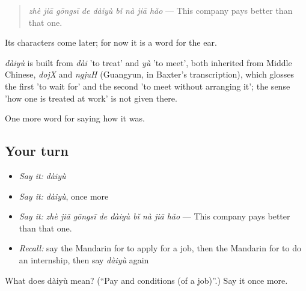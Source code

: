 \begin{quote}
\emph{zhè jiā gōngsī de dàiyù bǐ nà jiā hǎo} — This company pays better than that one.
\end{quote}

Its characters come later; for now it is a word for the ear.

\begin{cousinweb}
\emph{dàiyù} is built from \emph{dài} 'to treat' and \emph{yù} 'to meet', both inherited from Middle Chinese, \emph{dojX} and \emph{ngjuH} (Guangyun, in Baxter's transcription), which glosses the first 'to wait for' and the second 'to meet without arranging it'; the sense 'how one is treated at work' is not given there.
\end{cousinweb}

\begin{grammarlens}[title={What you've built}]
One more word for saying how it was.
\end{grammarlens}

\subsection*{Your turn}
\begin{itemize}
\raggedright
  \item \emph{Say it:} \emph{dàiyù}
  \item \emph{Say it:} \emph{dàiyù}, once more
  \item \emph{Say it:} \emph{zhè jiā gōngsī de dàiyù bǐ nà jiā hǎo} — This company pays better than that one.
  \item \emph{Recall:} say the Mandarin for to apply for a job, then the Mandarin for to do an internship, then say \emph{dàiyù} again
\end{itemize}

\begin{tcolorbox}[breakable,colback=teal!4,colframe=teal!35!black,title={Before you move on}]
What does dàiyù mean? (\textquotedblleft{}Pay and conditions (of a job)\textquotedblright{}.) Say it once more.
\end{tcolorbox}
